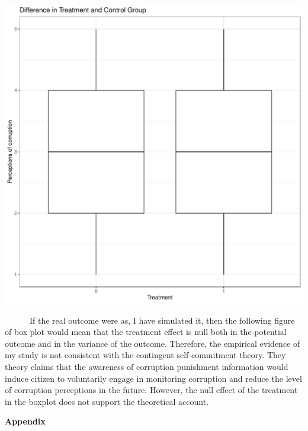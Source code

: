 \documentclass[
  11pt,
]{article}
\begin{document}
\includegraphics{PAP_Yea-Jin-Rha_files/figure-latex/mockfigure-1.pdf}

~~~~~~If the real outcome were as, I have simulated it, then the
following figure of box plot would mean that the treatment effect is
null both in the potential outcome and in the variance of the outcome.
Therefore, the empirical evidence of my study is not consistent with the
contingent self-commitment theory. They theory claims that the awareness
of corruption punishment information would induce citizen to voluntarily
engage in monitoring corruption and reduce the level of corruption
perceptions in the future. However, the null effect of the treatment in
the boxplot does not support the theoretical account.

\textbf{Appendix}
\end{document}
